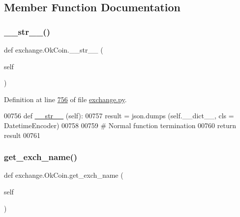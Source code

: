 \subsection{Member Function Documentation}
\mbox{\label{classexchange_1_1_ok_coin_af726894627f12bc46d199de5f454f2f4}} 
\subsubsection{\texorpdfstring{\+\_\+\+\_\+str\+\_\+\+\_\+()}{\_\_str\_\_()}}
{\footnotesize\ttfamily def exchange.\+Ok\+Coin.\+\_\+\+\_\+str\+\_\+\+\_\+ (\begin{DoxyParamCaption}\item[{}]{self }\end{DoxyParamCaption})}



Definition at line \hyperlink{exchange_8py_source_l00756}{756} of file \hyperlink{exchange_8py_source}{exchange.\+py}.


\begin{DoxyCode}
00756     \textcolor{keyword}{def }\hyperlink{namespacerates_a2f1a70c33ee9e255938e4c19fd207264}{\_\_str\_\_} (self):
00757         result = json.dumps (self.\_\_dict\_\_, cls = DatetimeEncoder)
00758         
00759         \textcolor{comment}{# Normal function termination}
00760         \textcolor{keywordflow}{return} result
00761 
\end{DoxyCode}
\mbox{\label{classexchange_1_1_ok_coin_a4bf45f3a1e9711ae38fd2eb01965e1d0}} 
\subsubsection{\texorpdfstring{get\+\_\+exch\+\_\+name()}{get\_exch\_name()}}
{\footnotesize\ttfamily def exchange.\+Ok\+Coin.\+get\+\_\+exch\+\_\+name (\begin{DoxyParamCaption}\item[{}]{self }\end{DoxyParamCaption})}



